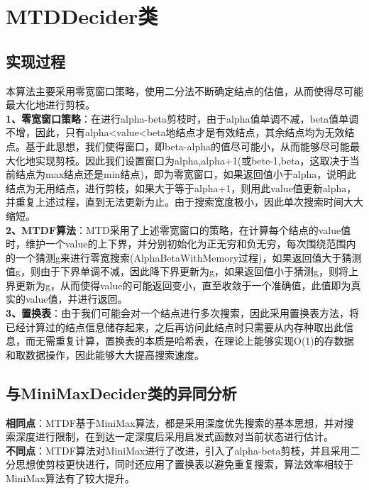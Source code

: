 \documentclass[UTF8]{article}
\begin{document}
\section{MTDDecider类}
\subsection{实现过程}
\indent 本算法主要采用零宽窗口策略，使用二分法不断确定结点的估值，从而使得尽可能最大化地进行剪枝。\\
\indent\textbf{1、零宽窗口策略}：在进行alpha-beta剪枝时，由于alpha值单调不减，beta值单调不增，因此，只有alpha<value<beta地结点才是有效结点，其余结点均为无效结点。基于此思想，我们使得窗口，即beta-alpha的值尽可能小，从而能够尽可能最大化地实现剪枝。因此我们设置窗口为alpha,alpha+1(或bete-1,beta，这取决于当前结点为max结点还是min结点)，即为零宽窗口，如果返回值小于alpha，说明此结点为无用结点，进行剪枝，如果大于等于alpha+1，则用此value值更新alpha，并重复上述过程，直到无法更新为止。由于搜索宽度极小，因此单次搜索时间大大缩短。\\
\indent\textbf{2、MTDF算法}：MTD采用了上述零宽窗口的策略，在计算每个结点的value值时，维护一个value的上下界，并分别初始化为正无穷和负无穷，每次围绕范围内的一个猜测g来进行零宽搜索(AlphaBetaWithMemory过程)，如果返回值大于猜测值g，则由于下界单调不减，因此降下界更新为g，如果返回值小于猜测g，则将上界更新为g，从而使得value的可能返回变小，直至收敛于一个准确值，此值即为真实的value值，并进行返回。\\
\indent\textbf{3、置换表}：由于我们可能会对一个结点进行多次搜索，因此采用置换表方法，将已经计算过的结点信息储存起来，之后再访问此结点时只需要从内存种取出此信息，而无需重复计算，置换表的本质是哈希表，在理论上能够实现O(1)的存数据和取数据操作，因此能够大大提高搜索速度。

\subsection{与MiniMaxDecider类的异同分析}
\indent\textbf{相同点}：MTDF基于MiniMax算法，都是采用深度优先搜索的基本思想，并对搜索深度进行限制，在到达一定深度后采用启发式函数对当前状态进行估计。\\
\indent\textbf{不同点}：MTDF算法对MiniMax进行了改进，引入了alpha-beta剪枝，并且采用二分思想使剪枝更快进行，同时还应用了置换表以避免重复搜索，算法效率相较于MiniMax算法有了较大提升。\\
\end{document}
